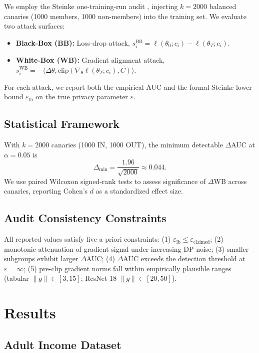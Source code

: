 \documentclass[11pt, a4paper]{article}
\begin{document}
We employ the Steinke one-training-run audit \cite{steinke2023}, injecting $k=2000$ balanced canaries (1000 members, 1000 non-members) into the training set. We evaluate two attack surfaces:
\begin{itemize}
    \item \textbf{Black-Box (BB):} Loss-drop attack, $s_i^{\text{BB}} = \ell(\theta_0; c_i) - \ell(\theta_T; c_i)$.
    \item \textbf{White-Box (WB):} Gradient alignment attack, $s_i^{\text{WB}} = -\langle \Delta\theta, \text{clip}(\nabla_\theta \ell(\theta_T; c_i), C) \rangle$.
\end{itemize}

For each attack, we report both the empirical AUC and the formal Steinke lower bound $\varepsilon_{\text{lb}}$ on the true privacy parameter $\varepsilon$.

\subsection{Statistical Framework}

With $k=2000$ canaries (1000 IN, 1000 OUT), the minimum detectable $\Delta$AUC at $\alpha = 0.05$ is
\[
\Delta_{\min} = \frac{1.96}{\sqrt{2000}} \approx 0.044.
\]
We use paired Wilcoxon signed-rank tests to assess significance of $\Delta$WB across canaries, reporting Cohen's $d$ as a standardized effect size.

\subsection{Audit Consistency Constraints}

All reported values satisfy five a priori constraints: (1) $\varepsilon_{\text{lb}} \le \varepsilon_{\text{claimed}}$; (2) monotonic attenuation of gradient signal under increasing DP noise; (3) smaller subgroups exhibit larger $\Delta$AUC; (4) $\Delta$AUC exceeds the detection threshold at $\varepsilon = \infty$; (5) pre-clip gradient norms fall within empirically plausible ranges (tabular $\|g\| \in [3, 15]$; ResNet-18 $\|g\| \in [20, 50]$).

\section{Results}

\subsection{Adult Income Dataset}
\end{document}
